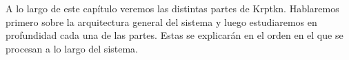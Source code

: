 A lo largo de este capítulo veremos las distintas partes de Krptkn. Hablaremos primero sobre la arquitectura general del sistema y luego estudiaremos en profundidad cada una de las partes. Estas se explicarán en el orden en el que se procesan a lo largo del sistema.